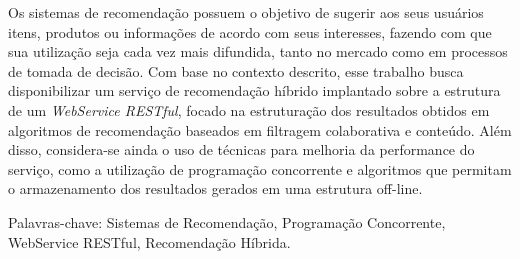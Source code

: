 \begin{resumo}
Os sistemas de recomendação possuem o objetivo de sugerir aos seus usuários itens, produtos ou informações de acordo com seus interesses, fazendo com que sua utilização seja cada vez mais difundida, tanto no mercado como em processos de tomada de decisão. Com base no contexto descrito, esse trabalho busca disponibilizar um serviço de recomendação híbrido implantado sobre a estrutura de um \textit{WebService RESTful}, focado na estruturação dos resultados obtidos em algoritmos de recomendação baseados em filtragem colaborativa e conteúdo. Além disso, considera-se ainda o uso de técnicas para melhoria da performance do serviço, como a utilização de programação concorrente e algoritmos que permitam o armazenamento dos resultados gerados em uma estrutura off-line.

Palavras-chave: Sistemas de Recomendação, Programação Concorrente, WebService RESTful, Recomendação Híbrida.

\end{resumo}